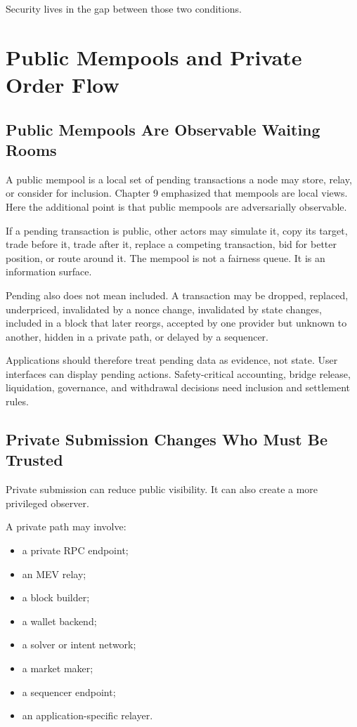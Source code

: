 Security lives in the gap between those two conditions.

\section{Public Mempools and Private Order Flow}

\subsection{Public Mempools Are Observable Waiting Rooms}

A public mempool is a local set of pending transactions a node may store, relay, or consider for inclusion. Chapter 9 emphasized that mempools are local views. Here the additional point is that public mempools are adversarially observable.

If a pending transaction is public, other actors may simulate it, copy its target, trade before it, trade after it, replace a competing transaction, bid for better position, or route around it. The mempool is not a fairness queue. It is an information surface.

Pending also does not mean included. A transaction may be dropped, replaced, underpriced, invalidated by a nonce change, invalidated by state changes, included in a block that later reorgs, accepted by one provider but unknown to another, hidden in a private path, or delayed by a sequencer.

Applications should therefore treat pending data as evidence, not state. User interfaces can display pending actions. Safety-critical accounting, bridge release, liquidation, governance, and withdrawal decisions need inclusion and settlement rules.

\subsection{Private Submission Changes Who Must Be Trusted}

Private submission can reduce public visibility. It can also create a more privileged observer.

A private path may involve:

\begin{itemize}
\item a private RPC endpoint;
\item an MEV relay;
\item a block builder;
\item a wallet backend;
\item a solver or intent network;
\item a market maker;
\item a sequencer endpoint;
\item an application-specific relayer.
\end{itemize}

